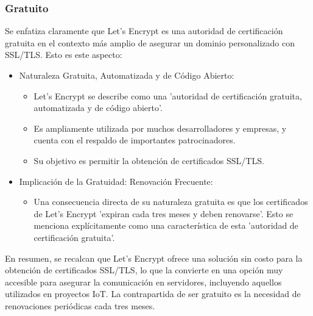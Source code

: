 \documentclass{report}
\begin{document}
\subsubsection{Gratuito}
Se enfatiza claramente que Let's Encrypt es una autoridad de certificación gratuita en el contexto más amplio 
de asegurar un dominio personalizado con SSL/TLS.
Esto es este aspecto:
\begin{itemize}
    \item Naturaleza Gratuita, Automatizada y de Código Abierto:
        \begin{itemize}
            \item Let's Encrypt se describe como una 'autoridad de certificación gratuita, automatizada y de código abierto'.
            \item Es ampliamente utilizada por muchos desarrolladores y empresas, y cuenta con el respaldo de importantes patrocinadores.
            \item Su objetivo es permitir la obtención de certificados SSL/TLS.
        \end{itemize}
    \item Implicación de la Gratuidad: Renovación Frecuente:
        \begin{itemize}
            \item Una consecuencia directa de su naturaleza gratuita es que los certificados de Let's Encrypt 'expiran cada tres meses 
            y deben renovarse'. Esto se menciona explícitamente como una característica de esta 'autoridad de certificación gratuita'.
        \end{itemize}
\end{itemize}
En resumen, se  recalcan que Let's Encrypt ofrece una solución sin costo para la obtención de certificados SSL/TLS, lo que la 
convierte en una opción muy accesible para asegurar la comunicación en servidores, incluyendo aquellos utilizados en proyectos IoT. 
La contrapartida de ser gratuito es la necesidad de renovaciones periódicas cada tres meses.
\end{document}
